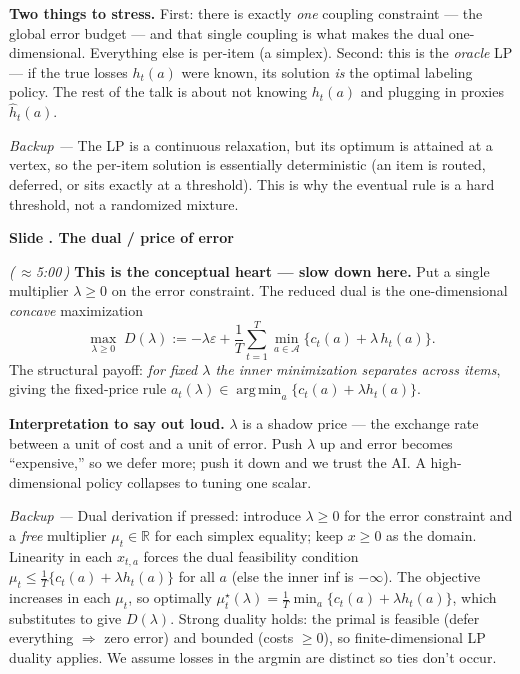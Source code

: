 \documentclass[11pt]{article}
\newcommand{\eps}{\varepsilon}
\newcommand{\R}{\mathbb{R}}
\newcommand{\calA}{\mathcal{A}}
\newcommand{\argmin}{\operatorname*{arg\,min}}
\newcommand{\hath}{\widehat h}
\newcommand{\cue}[1]{\textcolor{blue!60!black}{\textbf{#1}}}
\newcommand{\timecue}[1]{\hfill{\small\itshape(\,$\approx$#1\,)}}
\newcommand{\backup}[1]{{\small\textcolor{black!72}{\textit{Backup --- } #1}}}
\renewcommand{\thesection}{\arabic{section}}
\renewcommand{\section}[1]{%
  \refstepcounter{section}%
  \par\vspace{0.6\baselineskip}%
  {\large\bfseries\color{blue!45!black}Slide \thesection. #1}\par
  \vspace{0.2\baselineskip}}
\begin{document}
\cue{Two things to stress.} First: there is exactly \emph{one} coupling
constraint --- the global error budget --- and that single coupling is what
makes the dual one-dimensional. Everything else is per-item (a simplex). Second:
this is the \emph{oracle} LP --- if the true losses $h_t(a)$ were known, its
solution \emph{is} the optimal labeling policy. The rest of the talk is about not
knowing $h_t(a)$ and plugging in proxies $\hath_t(a)$.

\backup{The LP is a continuous relaxation, but its optimum is attained at a
vertex, so the per-item solution is essentially deterministic (an item is
routed, deferred, or sits exactly at a threshold). This is why the eventual rule
is a hard threshold, not a randomized mixture.}

\section{The dual / price of error}
\timecue{5:00}
\cue{This is the conceptual heart --- slow down here.} Put a single multiplier
$\lambda\ge0$ on the error constraint. The reduced dual is the one-dimensional
\emph{concave} maximization
\[
   \max_{\lambda\ge0}\;D(\lambda):=-\lambda\eps
     +\frac1T\sum_{t=1}^{T}\min_{a\in\calA}\{c_t(a)+\lambda\,h_t(a)\}.
\]
The structural payoff: \emph{for fixed $\lambda$ the inner minimization
separates across items}, giving the fixed-price rule
$a_t(\lambda)\in\argmin_a\{c_t(a)+\lambda h_t(a)\}$.

\cue{Interpretation to say out loud.} $\lambda$ is a shadow price --- the
exchange rate between a unit of cost and a unit of error. Push $\lambda$ up and
error becomes ``expensive,'' so we defer more; push it down and we trust the AI.
A high-dimensional policy collapses to tuning one scalar.

\backup{Dual derivation if pressed: introduce $\lambda\ge0$ for the error
constraint and a \emph{free} multiplier $\mu_t\in\R$ for each simplex equality;
keep $x\ge0$ as the domain. Linearity in each $x_{t,a}$ forces the dual
feasibility condition $\mu_t\le\frac1T\{c_t(a)+\lambda h_t(a)\}$ for all $a$ (else
the inner inf is $-\infty$). The objective increases in each $\mu_t$, so
optimally $\mu_t^\star(\lambda)=\frac1T\min_a\{c_t(a)+\lambda h_t(a)\}$, which
substitutes to give $D(\lambda)$. Strong duality holds: the primal is feasible
(defer everything $\Rightarrow$ zero error) and bounded (costs $\ge0$), so
finite-dimensional LP duality applies. We assume losses in the argmin are
distinct so ties don't occur.}
\end{document}
